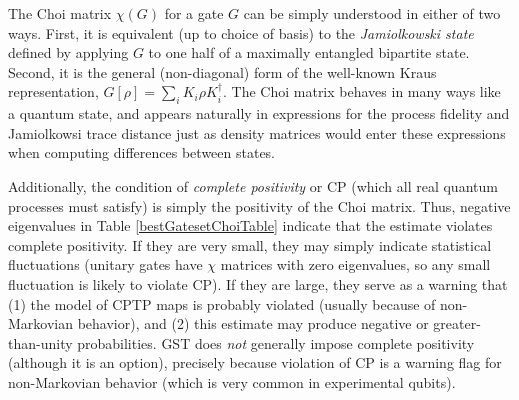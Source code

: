 \documentclass{article}[11pt]
\begin{document}
The Choi matrix $\chi(G)$ for a gate $G$ can be simply understood in either of two ways.  First, it is equivalent (up to choice of basis) to the \emph{Jamiolkowski state} defined by applying $G$ to one half of a maximally entangled bipartite state.  Second, it is the general (non-diagonal) form of the well-known Kraus representation, $G[\rho] = \sum_i{K_i\rho K_i^\dagger}$.  The Choi matrix behaves in many ways like a quantum state, and appears naturally in expressions for the process fidelity and Jamiolkowsi trace distance just as density matrices would enter these expressions when computing differences between states.  

Additionally, the condition of \emph{complete positivity} or CP (which all real quantum processes must satisfy) is simply the positivity of the Choi matrix.  Thus, negative eigenvalues in Table \ref{bestGatesetChoiTable} indicate that the estimate violates complete positivity.  If they are very small, they may simply indicate statistical fluctuations (unitary gates have $\chi$ matrices with zero eigenvalues, so any small fluctuation is likely to violate CP).  If they are large, they serve as a warning that (1) the model of CPTP maps is probably violated (usually because of non-Markovian behavior), and (2) this estimate may produce negative or greater-than-unity probabilities.  GST does \emph{not} generally impose complete positivity (although it is an option), precisely because violation of CP is a warning flag for non-Markovian behavior (which is very common in experimental qubits).
\end{document}
